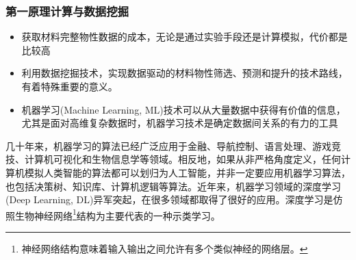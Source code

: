 \small
%
\frame
{
	\frametitle{第一原理计算与数据挖掘}
	\begin{itemize}
		\item 获取材料完整物性数据的成本，无论是通过实验手段还是计算模拟，代价都是比较高%
		\item 利用数据挖掘技术，实现数据驱动的材料物性筛选、预测和提升的技术路线，有着特殊重要的意义。
		\item 机器学习\textrm{(Machine Learning, ML)}技术可以从大量数据中获得有价值的信息，尤其是面对高维复杂数据时，机器学习技术是确定数据间关系的有力的工具
	\end{itemize}
几十年来，机器学习的算法已经广泛应用于金融、导航控制、语言处理、游戏竞技、计算机可视化和生物信息学等领域。相反地，如果从非严格角度定义，任何计算机模拟人类智能的算法都可以划归为人工智能，并非一定要应用机器学习算法，也包括决策树、知识库、计算机逻辑等算法。近年来，机器学习领域的深度学习\textrm{(Deep Learning, DL)}异军突起，在很多领域都取得了很好的应用。深度学习是仿照生物神经网络\footnote{神经网络结构意味着输入输出之间允许有多个类似神经的网络层。}结构为主要代表的一种示类学习。
}

